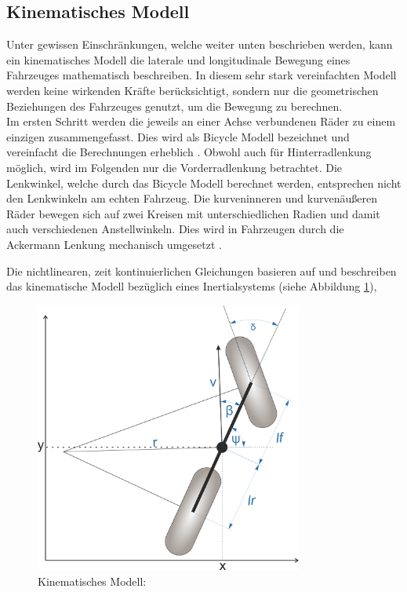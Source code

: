\documentclass{like}
\begin{document}
\subsection{Kinematisches Modell}
\label{kinematicModel}
Unter gewissen Einschränkungen, welche weiter unten beschrieben werden, kann ein kinematisches Modell die laterale und longitudinale Bewegung eines Fahrzeuges mathematisch beschreiben. In diesem sehr stark vereinfachten Modell werden keine wirkenden Kräfte berücksichtigt, sondern nur die geometrischen Beziehungen des Fahrzeuges genutzt, um die Bewegung zu berechnen. \\
Im ersten Schritt werden die jeweils an einer Achse verbundenen Räder zu einem einzigen zusammengefasst. Dies wird als Bicycle Modell bezeichnet und vereinfacht die Berechnungen erheblich \cite{BicycleModel}. Obwohl auch für Hinterradlenkung möglich, wird im Folgenden nur die Vorderradlenkung betrachtet. Die Lenkwinkel, welche durch das Bicycle Modell berechnet werden, entsprechen nicht den Lenkwinkeln am echten Fahrzeug. Die kurveninneren und kurvenäußeren Räder bewegen sich auf zwei Kreisen mit unterschiedlichen Radien und damit auch verschiedenen Anstellwinkeln. Dies wird in Fahrzeugen durch die Ackermann Lenkung mechanisch umgesetzt \cite{rajamani2011vehicle}.


Die nichtlinearen, zeit kontinuierlichen Gleichungen basieren auf \cite{rajamani2011vehicle, 7225830} und beschreiben das kinematische Modell bezüglich eines Inertialsystems (siehe Abbildung \ref{fig:kinmodel}),

\begin{figure}[ht!]
	\centering
	\includegraphics[width=250pt]{Abbildungen/kinBicycle.png}
	\caption{Kinematisches Modell:}
	\label{fig:kinmodel}
\end{figure}
\end{document}
